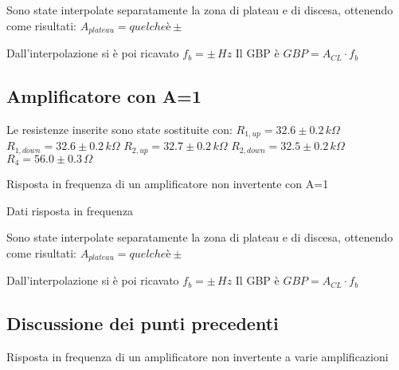 Sono state interpolate separatamente la zona di plateau e di discesa, ottenendo come risultati:
$A_{plateau}=quel che è \pm$

Dall'interpolazione si è poi ricavato 
$f_b= \pm \,Hz $
Il GBP è
$GBP=A_{CL} \cdot f_b $


\subsection{Amplificatore con A=1}
Le resistenze inserite sono state sostituite con:
$R_{1,up}=32.6 \pm 0.2 \,k\Omega $%
$R_{1,down}=32.6 \pm 0.2\,k\Omega$ %
$R_{2,up}=32.7 \pm 0.2\,k\Omega$ %
$R_{2,down}=32.5 \pm 0.2\,k\Omega$
$R_4=56.0 \pm 0.3\,\Omega$
\begin{grafico}
 \centering 
  
 \caption{Risposta in frequenza di un amplificatore non invertente con A=1} 
 \label{gr:amp_noninv_A1.tex} 
\end{grafico}

\begin{tabella}
 \centering
  
 \caption{Dati risposta in frequenza}
 \label{tab:tab_noninv_A1.tex}
\end{tabella}

Sono state interpolate separatamente la zona di plateau e di discesa, ottenendo come risultati:
$A_{plateau}=quel che è \pm$

Dall'interpolazione si è poi ricavato 
$f_b= \pm \,Hz $
Il GBP è
$GBP=A_{CL} \cdot f_b $

\subsection{Discussione dei punti precedenti}

\begin{grafico}
 \centering 
  
 \caption{Risposta in frequenza di un amplificatore non invertente a varie amplificazioni} 
 \label{gr:amp_noninv_all.tex} 
\end{grafico}



